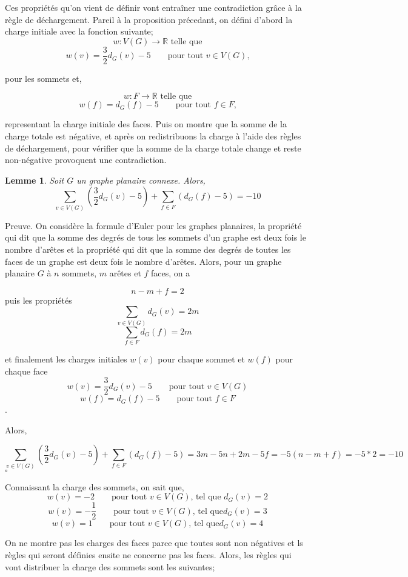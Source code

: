 \documentclass[10pt,a4paper]{article}
\newtheorem{lemme}{Lemme}
\newcommand{\ep}{{\hfill $\square$}}
\begin{document}
\bigskip
Ces propriétés qu'on vient de définir vont entraîner une contradiction grâce à la règle de déchargement. Pareil à la proposition précedant, on défini d'abord la charge initiale avec la fonction suivante;
$$w: V(G) \to \mathbb{R} \textrm{ telle que} $$
 $$w(v) = \frac{3}{2} d_G(v) - 5 \qquad \textrm{pour tout $v\in V(G)$,}$$

pour les sommets et,

$$w: F \to \mathbb{R} \textrm{ telle que} $$
 $$w(f) = d_G(f) - 5 \qquad \textrm{pour tout $f\in F$,}$$
 
representant la charge initiale des faces. Puis on montre que la somme de la charge totale est négative, et après on redistribuons la charge à l'aide des règles de déchargement, pour vérifier que la somme de la charge totale change et reste non-négative provoquent une contradiction.

\begin{lemme}
Soit $G$ un graphe planaire connexe. Alors,
$$ \sum_{v \in V(G)} (\frac{3}{2} d_G(v) - 5) + \sum_{f\in F} (d_G(f) -5) = -10$$
\end{lemme}

Preuve.
On considère la formule d'Euler pour les graphes planaires, la propriété qui dit que la somme des degrés de tous les sommets d'un graphe est deux fois le nombre d'arêtes et la propriété qui dit que la somme des degrés de toutes les faces de un graphe est deux fois le nombre d'arêtes. Alors, pour un graphe planaire $G$ à $n$ sommets, $m$ arêtes et $f$ faces, on a

$$ n - m + f = 2 $$
puis les propriétés
$$ \sum_{v\in V(G)} d_G(v) = 2m$$
$$ \sum_{f\in F} d_G(f) = 2m$$

et finalement les charges initiales $w(v)$ pour chaque sommet et $w(f)$ pour chaque face
$$ w(v) = \frac{3}{2}d_G(v) - 5 \qquad \textrm{pour tout $v \in V(G)$}$$
$$ w(f) = d_G(f) - 5 \qquad \textrm{pour tout $f \in F$}$$.

Alors,

$$ \sum_{v \in V(G)} (\frac{3}{2}d_G(v) - 5) + \sum_{f\in F} (d_G(f) -5) = 3m -5n + 2m - 5f = -5(n - m + f) = -5*2 = -10$$
\ep 

Connaissant la charge des sommets, on sait que,
$$ w(v) = -2 \qquad \textrm{pour tout $v \in V(G)$, tel que } d_G(v) = 2$$
$$ w(v) = -\frac{1}{2} \qquad \textrm{pour tout $v \in V(G)$, tel que} d_G(v) = 3$$
$$ w(v) =  1 \qquad \textrm{pour tout $v \in V(G)$, tel que} d_G(v) = 4$$

On ne montre pas les charges des faces parce que toutes sont non négatives et ls règles qui seront définies ensite ne concerne pas les faces. Alors, les règles qui vont distribuer la charge des sommets sont les suivantes;
\end{document}
